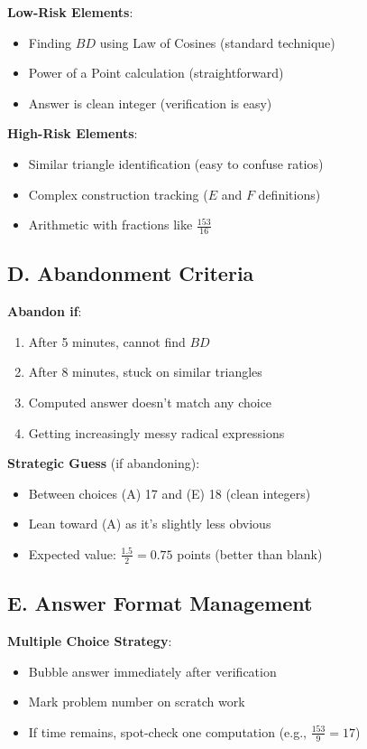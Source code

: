 \documentclass[]{article}
\begin{document}
\begin{competitionbox}
\textbf{Low-Risk Elements}:
\begin{itemize}[leftmargin=*]
    \item Finding $BD$ using Law of Cosines (standard technique)
    \item Power of a Point calculation (straightforward)
    \item Answer is clean integer (verification is easy)
\end{itemize}

\textbf{High-Risk Elements}:
\begin{itemize}[leftmargin=*]
    \item Similar triangle identification (easy to confuse ratios)
    \item Complex construction tracking ($E$ and $F$ definitions)
    \item Arithmetic with fractions like $\frac{153}{16}$
\end{itemize}

\subsection*{D. Abandonment Criteria}

\textbf{Abandon if}:
\begin{enumerate}
    \item After 5 minutes, cannot find $BD$
    \item After 8 minutes, stuck on similar triangles
    \item Computed answer doesn't match any choice
    \item Getting increasingly messy radical expressions
\end{enumerate}

\textbf{Strategic Guess} (if abandoning):
\begin{itemize}
    \item Between choices (A) 17 and (E) 18 (clean integers)
    \item Lean toward (A) as it's slightly less obvious
    \item Expected value: $\frac{1.5}{2} = 0.75$ points (better than blank)
\end{itemize}

\subsection*{E. Answer Format Management}

\textbf{Multiple Choice Strategy}:
\begin{itemize}[leftmargin=*]
    \item Bubble answer immediately after verification
    \item Mark problem number on scratch work
    \item If time remains, spot-check one computation (e.g., $\frac{153}{9} = 17$)
\end{itemize}


\end{competitionbox}
\end{document}
